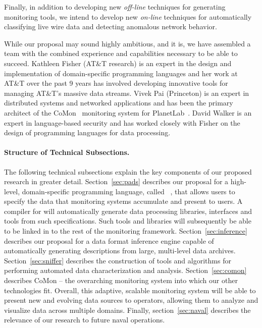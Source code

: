 Finally, in addition to developing new {\em off-line} techniques for
generating monitoring tools, we intend to develop new {\em on-line}
techniques for automatically classifying live wire data and
detecting anomalous network behavior.

While our proposal may sound highly ambitious, and it is, we have
assembled a team with the combined experience and capabilities
necessary to be able to succeed.  Kathleen Fisher (AT\&T research) 
is an expert in the design and implementation of domain-specific
programming languages and her work at AT\&T over the past 9 years
has involved developing innovative tools for managing AT\&T's
massive data streams.  Vivek Pai (Princeton) is an expert in distributed
systems and networked applications
and has been the primary architect of the CoMon~\cite{CoMon} monitoring system
for PlanetLab~\cite{planetlab}.  David Walker is an expert in language-based security
and has worked closely with Fisher on the design of programming languages
for data processing. 

\paragraph*{Structure of Technical Subsections.}
The following technical subsections explain the key components of
our proposed research in greater detail.    
Section~\ref{sec:pads} describes our proposal for a high-level, 
domain-specific programming language, called
\pads{}~\cite{fisher+:pads,fisher+:popl06,mandelbaum+:pads-ml}, that
allows users to specify the data that monitoring systems 
accumulate and present to users.  A compiler for \pads{} will
automatically generate data processing libraries, interfaces and tools
from such specifications.  Such tools and libraries will subsequently 
be able to be linked in to the
rest of the monitoring framework.   
Section~\ref{sec:inference} describes our proposal for a 
data format inference engine capable
of automatically generating \pads{} descriptions from
large, multi-level data archives.   Section~\ref{sec:sniffer}
describes the construction of tools and algorithms for 
performing automated data characterization and analysis.
Section~\ref{sec:comon}
describes CoMon -- the overarching monitoring system into which our other 
technologies fit.  Overall, this adaptive, scalable monitoring system will 
be able to present new and evolving data sources to operators, allowing them to
analyze and visualize data across multiple domains.  Finally, 
section~\ref{sec:naval} describes the relevance of our research to future
naval operations.



